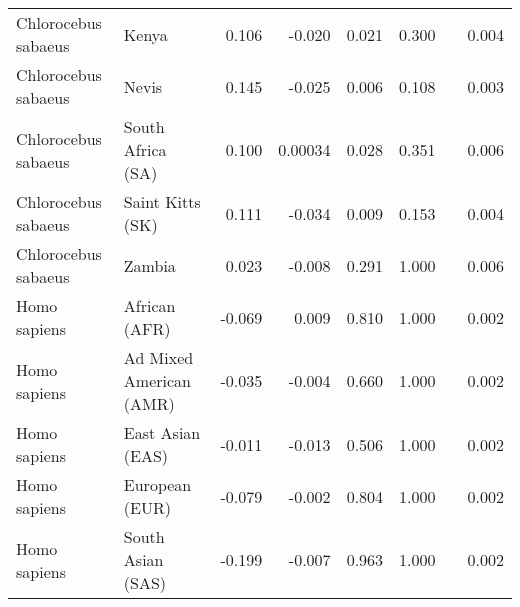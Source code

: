 \begin{center}
\begin{adjustbox}{width = 1\textwidth}
\begin{tabular}{|l|l|r|r|r|r|r|}
 Chlorocebus sabaeus &                           Kenya &                 0.106 &                               -0.020 &                0.021 &                                  0.300~~ &              0.004 \\
 Chlorocebus sabaeus &                           Nevis &                 0.145 &                               -0.025 &                0.006 &                                  0.108~~ &              0.003 \\
 Chlorocebus sabaeus &               South Africa (SA) &                 0.100 &                              0.00034 &                0.028 &                                  0.351~~ &              0.006 \\
 Chlorocebus sabaeus &                Saint Kitts (SK) &                 0.111 &                               -0.034 &                0.009 &                                  0.153~~ &              0.004 \\
 Chlorocebus sabaeus &                          Zambia &                 0.023 &                               -0.008 &                0.291 &                                  1.000~~ &              0.006 \\
        Homo sapiens &                   African (AFR) &                -0.069 &                                0.009 &                0.810 &                                  1.000~~ &              0.002 \\
        Homo sapiens &         Ad Mixed American (AMR) &                -0.035 &                               -0.004 &                0.660 &                                  1.000~~ &              0.002 \\
        Homo sapiens &                East Asian (EAS) &                -0.011 &                               -0.013 &                0.506 &                                  1.000~~ &              0.002 \\
        Homo sapiens &                  European (EUR) &                -0.079 &                               -0.002 &                0.804 &                                  1.000~~ &              0.002 \\
        Homo sapiens &               South Asian (SAS) &                -0.199 &                               -0.007 &                0.963 &                                  1.000~~ &              0.002 \\
\bottomrule
\end{tabular}
\end{adjustbox}
\end{center}
\newpage
